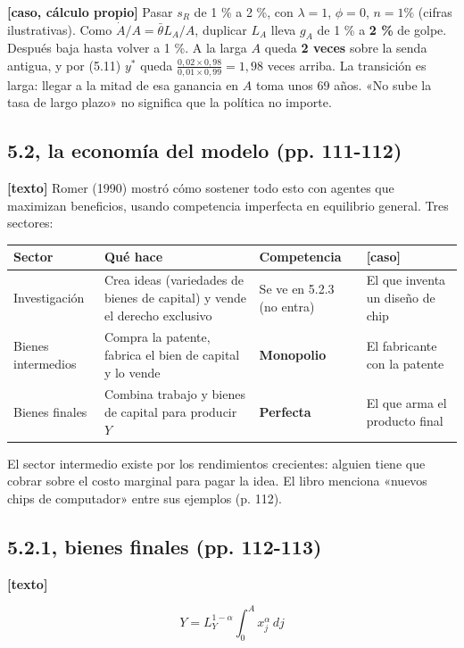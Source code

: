 \documentclass[11pt,a4paper]{article}
\begin{document}
\textbf{[caso, cálculo propio]} Pasar $s_R$ de 1 \% a 2 \%, con $\lambda = 1$, $\phi = 0$, $n = 1\%$ (cifras ilustrativas). Como $\dot A/A = \bar\theta L_A/A$, duplicar $L_A$ lleva $g_A$ de 1 \% a \textbf{2 \%} de golpe. Después baja hasta volver a 1 \%. A la larga $A$ queda \textbf{2 veces} sobre la senda antigua, y por (5.11) $y^*$ queda $\frac{0{,}02 \times 0{,}98}{0{,}01 \times 0{,}99} = 1{,}98$ veces arriba. La transición es larga: llegar a la mitad de esa ganancia en $A$ toma unos 69 años. «No sube la tasa de largo plazo» no significa que la política no importe.

\subsection*{5.2, la economía del modelo (pp. 111-112)}

\textbf{[texto]} Romer (1990) mostró cómo sostener todo esto con agentes que maximizan beneficios, usando competencia imperfecta en equilibrio general. Tres sectores:

\begin{center}\small\begin{tabular}{p{2.6cm}p{5.6cm}p{2.7cm}p{3.2cm}}\toprule
Sector & Qué hace & Competencia & [caso] \\\midrule
Investigación & Crea ideas (variedades de bienes de capital) y vende el derecho exclusivo & Se ve en 5.2.3 (no entra) & El que inventa un diseño de chip \\
Bienes intermedios & Compra la patente, fabrica el bien de capital y lo vende & \textbf{Monopolio} & El fabricante con la patente \\
Bienes finales & Combina trabajo y bienes de capital para producir $Y$ & \textbf{Perfecta} & El que arma el producto final \\
\bottomrule\end{tabular}\end{center}

El sector intermedio existe por los rendimientos crecientes: alguien tiene que cobrar sobre el costo marginal para pagar la idea. El libro menciona «nuevos chips de computador» entre sus ejemplos (p. 112).

\subsection*{5.2.1, bienes finales (pp. 112-113)}

\textbf{[texto]}

\begin{equation*}Y = L_Y^{1-\alpha}\int_0^A x_j^\alpha\, dj\end{equation*}
\end{document}
